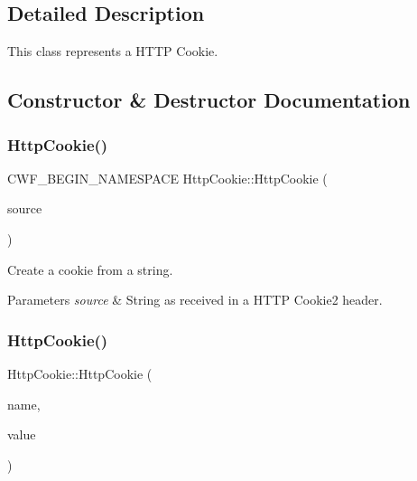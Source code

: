 \subsection{Detailed Description}
This class represents a H\+T\+TP Cookie. 

\subsection{Constructor \& Destructor Documentation}
\mbox{\label{class_http_cookie_aeb0f2cb5f7e8ef2fc7503663e29941c4}} 
\subsubsection{\texorpdfstring{Http\+Cookie()}{HttpCookie()}\hspace{0.1cm}{\footnotesize\ttfamily [1/2]}}
{\footnotesize\ttfamily C\+W\+F\+\_\+\+B\+E\+G\+I\+N\+\_\+\+N\+A\+M\+E\+S\+P\+A\+CE Http\+Cookie\+::\+Http\+Cookie (\begin{DoxyParamCaption}\item[{const Q\+Byte\+Array \&}]{source }\end{DoxyParamCaption})\hspace{0.3cm}{\ttfamily [explicit]}}

Create a cookie from a string. 
\begin{DoxyParams}{Parameters}
{\em source} & String as received in a H\+T\+TP Cookie2 header. \\
\hline
\end{DoxyParams}
\mbox{\label{class_http_cookie_a2037d1e3f9a6f65f0f3575df1cfcc200}} 
\subsubsection{\texorpdfstring{Http\+Cookie()}{HttpCookie()}\hspace{0.1cm}{\footnotesize\ttfamily [2/2]}}
{\footnotesize\ttfamily Http\+Cookie\+::\+Http\+Cookie (\begin{DoxyParamCaption}\item[{const Q\+Byte\+Array \&}]{name,  }\item[{const Q\+Byte\+Array \&}]{value }\end{DoxyParamCaption})}



